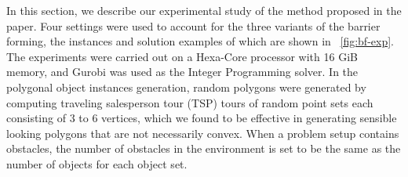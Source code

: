 In this section, we describe our experimental study of the method proposed in the paper.
Four settings were used to account for the three variants of the barrier forming, the instances and solution examples of which are shown in ~\ref{fig:bf-exp}. 
The experiments were carried out on a Hexa-Core processor with 16 GiB memory, and Gurobi
\cite{optimization2019gurobi} was used as the Integer Programming solver.
In the polygonal object instances generation, random polygons were generated by computing traveling salesperson tour (TSP) tours of random point sets each consisting of $3$ to $6$ vertices, which we found to be effective in generating sensible looking polygons that are not necessarily convex.
%
When a problem setup contains obstacles, the number of obstacles in the environment is set to be the same as the number of objects for each object set.


